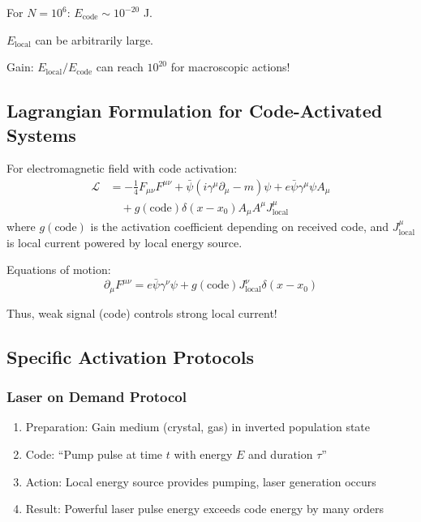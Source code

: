 \documentclass[11pt,a4paper]{article}
\begin{document}
	For $N=10^6$: $E_{\text{code}} \sim 10^{-20}$ J.
	
	$E_{\text{local}}$ can be arbitrarily large.
	
	Gain: $E_{\text{local}} / E_{\text{code}}$ can reach $10^{20}$ for macroscopic actions!
	
	\subsection{Lagrangian Formulation for Code-Activated Systems}
	
	For electromagnetic field with code activation:
	\begin{align}
		\mathcal{L} &= -\frac{1}{4} F_{\mu\nu} F^{\mu\nu} + \bar{\psi}(i\gamma^\mu\partial_\mu - m)\psi + e\bar{\psi}\gamma^\mu\psi A_\mu \\
		&\quad + g(\text{code}) \delta(x - x_0) A_\mu A^\mu J_{\text{local}}^\mu
	\end{align}
	where $g(\text{code})$ is the activation coefficient depending on received code, and $J_{\text{local}}^\mu$ is local current powered by local energy source.
	
	Equations of motion:
	\begin{equation}
		\partial_\mu F^{\mu\nu} = e\bar{\psi}\gamma^\nu\psi + g(\text{code}) J_{\text{local}}^\nu \delta(x - x_0)
	\end{equation}
	
	Thus, weak signal (code) controls strong local current!
	
	\subsection{Specific Activation Protocols}
	
	\subsubsection{Laser on Demand Protocol}
	\begin{enumerate}
		\item Preparation: Gain medium (crystal, gas) in inverted population state
		\item Code: ``Pump pulse at time $t$ with energy $E$ and duration $\tau$''
		\item Action: Local energy source provides pumping, laser generation occurs
		\item Result: Powerful laser pulse energy exceeds code energy by many orders
	\end{enumerate}
	
\end{document}
